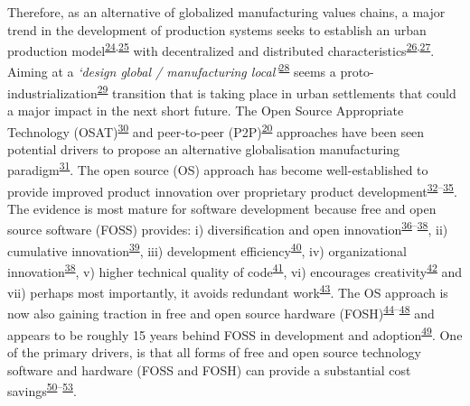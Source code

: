 \documentclass[
  11pt,
  a4paperpaper,
  onecolumn]{article}
\begin{document}
Therefore, as an alternative of globalized manufacturing values chains,
a major trend in the development of production systems seeks to
establish an urban production
model\textsuperscript{\protect\hyperlink{ref-Herrmann2020}{24},\protect\hyperlink{ref-juraschek2022}{25}}
with decentralized and distributed
characteristics\textsuperscript{\protect\hyperlink{ref-priavolou2022}{26},\protect\hyperlink{ref-cerdas2017}{27}}.
Aiming at a \emph{`design global / manufacturing
local'}\textsuperscript{\protect\hyperlink{ref-Kostakis2018}{28}} seems
a
proto-industrialization\textsuperscript{\protect\hyperlink{ref-sabel1985}{29}}
transition that is taking place in urban settlements that could a major
impact in the next short future. The Open Source Appropriate Technology
(OSAT)\textsuperscript{\protect\hyperlink{ref-Pearce2010}{30}} and
peer-to-peer
(P2P)\textsuperscript{\protect\hyperlink{ref-Kostakis2013}{20}}
approaches have been seen potential drivers to propose an alternative
globalisation manufacturing
paradigm\textsuperscript{\protect\hyperlink{ref-Heikkinen2020a}{31}}.
The open source (OS) approach has become well-established to provide
improved product innovation over proprietary product
development\textsuperscript{\protect\hyperlink{ref-dibona1999}{32}--\protect\hyperlink{ref-deek2007}{35}}.
The evidence is most mature for software development because free and
open source software (FOSS) provides: i) diversification and open
innovation\textsuperscript{\protect\hyperlink{ref-colombo2014}{36}--\protect\hyperlink{ref-alexy2013}{38}},
ii) cumulative
innovation\textsuperscript{\protect\hyperlink{ref-boudreau2016}{39}},
iii) development
efficiency\textsuperscript{\protect\hyperlink{ref-hienerth2014}{40}},
iv) organizational
innovation\textsuperscript{\protect\hyperlink{ref-alexy2013}{38}}, v)
higher technical quality of
code\textsuperscript{\protect\hyperlink{ref-soderberg2015}{41}}, vi)
encourages
creativity\textsuperscript{\protect\hyperlink{ref-martinez2015}{42}} and
vii) perhaps most importantly, it avoids redundant
work\textsuperscript{\protect\hyperlink{ref-Ardal2016}{43}}. The OS
approach is now also gaining traction in free and open source hardware
(FOSH)\textsuperscript{\protect\hyperlink{ref-thompson2011}{44}--\protect\hyperlink{ref-li2018}{48}}
and appears to be roughly 15 years behind FOSS in development and
adoption\textsuperscript{\protect\hyperlink{ref-pearce2018}{49}}. One of
the primary drivers, is that all forms of free and open source
technology software and hardware (FOSS and FOSH) can provide a
substantial cost
savings\textsuperscript{\protect\hyperlink{ref-petch2014}{50}--\protect\hyperlink{ref-wittbrodt2013}{53}}.
\end{document}

